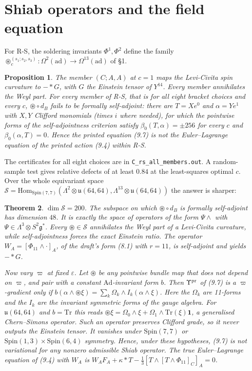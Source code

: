 \documentclass[11pt]{article}
\newtheorem{theorem}{Theorem}
\newtheorem{proposition}[theorem]{Proposition}
\theoremstyle{remark}
\begin{document}
\section{Shiab operators and the field equation}
For R-S, the soldering invariants $\Phi^1,\Phi^2$ define the family $\circledast^{(s_1;s_2,s_3)}_c:\Omega^2(\mathrm{ad})\to\Omega^{13}(\mathrm{ad})$ of \S1.
\begin{proposition}
The member $(C;A,A)$ at $c=1$ maps the Levi-Civita spin curvature to $-{*}G$, with $G$ the Einstein tensor of $Y^{14}$. Every member annihilates the Weyl part. For every member of R-S, that is for all eight bracket choices and every $c$, $\circledast\circ d_B$ fails to be formally self-adjoint: there are $T=Xe^0$ and $\alpha=Ye^1$ with $X,Y$ Clifford monomials (times $i$ where needed), for which the pointwise forms of the self-adjointness criterion satisfy $\beta_0(T,\alpha)=\pm256$ for every $c$ and $\beta_0(\alpha,T)=0$. Hence the printed equation (9.7) is not the Euler--Lagrange equation of the printed action (9.4) within R-S.
\end{proposition}
The certificates for all eight choices are in \texttt{C\_rs\_all\_members.out}. A random-sample test gives relative defects of at least $0.84$ at the least-squares optimal $c$. Over the whole equivariant space $\mathcal S=\mathrm{Hom}_{\mathrm{Spin}(7,7)}(\Lambda^2\otimes\mathfrak u(64,64),\Lambda^{13}\otimes\mathfrak u(64,64))$ the answer is sharper:
\begin{theorem}
$\dim\mathcal S=200$. The subspace on which $\circledast\circ d_B$ is formally self-adjoint has dimension $48$. It is exactly the space of operators of the form $\Psi\wedge$ with $\Psi\in\Lambda^3\otimes S^2\mathfrak g^*$. Every $\circledast\in\mathcal S$ annihilates the Weyl part of a Levi-Civita curvature, while self-adjointness forces the exact Einstein ratio. The operator $W_A=[\Phi_{11}\wedge\cdot]_A$, of the draft's form (8.1) with $r=11$, is self-adjoint and yields $-{*}G$.

Now vary $\varpi$ at fixed $\varepsilon$. Let $\circledast$ be any pointwise bundle map that does not depend on $\varpi$, and pair with a constant $\mathrm{Ad}$-invariant form $b$. Then $\Upsilon^{\rm pr}$ of (9.7) is a $\varpi$-gradient only if $b(\alpha\wedge\circledast\xi)=\sum_k\Omega_k\wedge I_k(\alpha\wedge\xi)$. Here the $\Omega_k$ are 11-forms and the $I_k$ are the invariant symmetric forms of the gauge algebra. For $\mathfrak u(64,64)$ and $b=\mathrm{Tr}$ this reads $\circledast\xi=\Omega_0\wedge\xi+\Omega_1\wedge\mathrm{Tr}(\xi)\mathbf 1$, a generalised Chern--Simons operator. Such an operator preserves Clifford grade, so it never outputs the Einstein tensor. It vanishes under $\mathrm{Spin}(7,7)$ or $\mathrm{Spin}(1,3)\times\mathrm{Spin}(6,4)$ symmetry. Hence, under these hypotheses, (9.7) is not variational for any nonzero admissible Shiab operator. The true Euler--Lagrange equation of (9.4) with $W_A$ is $W_AF_A+\kappa{*}T-\tfrac13[T\wedge[T\wedge\Phi_{11}]_C]_A=0$.
\end{theorem}
\end{document}
